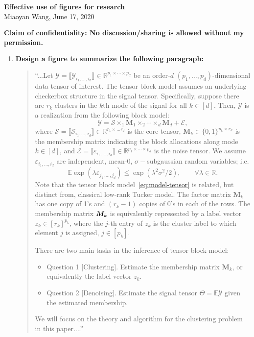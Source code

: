 \documentclass[11pt]{article}
\theoremstyle{plain}
\theoremstyle{definition}
\def\entry#1{\llbracket #1 \rrbracket}
\newcommand{\cS}{\mathcal{S}}
\newcommand{\cE}{{\mathcal{E}}}
\newcommand{\cY}{{\mathcal{Y}}}
\newcommand{\0}{{\mathbf{0}}}
\newcommand{\1}{{\mathbf{1}}}
\newcommand{\M}{{\mathbf{M}}}
\newcommand{\bbR}{\mathbb{R}}
\newcommand{\bbE}{\mathbb{E}}
\begin{document}
\begin{center}
{\bf \large Effective use of figures for research}\\
Miaoyan Wang, June 17, 2020\\
\end{center}

{\bf Claim of confidentiality: No discussion/sharing is allowed without my permission. }
\begin{enumerate}
\item {\bf Design a figure to summarize the following paragraph:}
\begin{quote}
``...Let $\cY=\entry{\cY_{i_1,\dots,i_d}} \in \bbR^{p_1 \times \cdots \times p_d}$ be an order-$d$ $(p_1,\ldots,p_d)$-dimensional data tensor of interest. The tensor block model assumes an underlying checkerbox structure in the signal tensor. Specifically, suppose there are $r_k$ clusters in the $k$th mode of the signal for all $k \in [d]$. Then, $\cY$ is a realization from the following block model:
\begin{equation}\label{eq:model-tensor}
	\cY = \cS \times_1 \M_1 \times_2 \cdots \times_d \M_d + \cE,
\end{equation}
where $\cS=\entry{\cS_{i_1,\ldots,i_d}}\in \bbR^{r_1 \times \ldots r_d}$ is the core tensor, $\M_k\in\{0,1\}^{p_k\times r_k}$ is the membership matrix indicating the block allocations along mode $k\in[d]$, and $\cE=\entry{\varepsilon_{i_1,\ldots,i_d}}\in \mathbb{R}^{p_1\times \cdots \times p_d}$ is the noise tensor. We assume $\varepsilon_{i_1,\ldots,i_d}$ are independent, mean-$0$, $\sigma-$subgaussian random variables; i.e.
\[
\bbE \exp\left(\lambda\varepsilon_{j_1,\ldots,j_d}\right) \leq \exp\left(\lambda^2\sigma^2/2\right),\qquad \forall \lambda \in \bbR.
\]
Note that the tensor block model~\eqref{eq:model-tensor} is related, but distinct from, classical low-rank Tucker model. The factor matrix $\M_k$ has one copy of 1's and $(r_k-1)$ copies of 0's in each of the rows. The membership matrix $\bm M_k$ is equivalently represented by a label vector $z_k\in[r_k]^{p_k}$, where the $j$-th entry of $z_k$ is the cluster label to which element $j$ is assigned, $j\in[p_k].$

There are two main tasks in the inference of tensor block model:
\begin{itemize}
\item Question 1 [Clustering]. Estimate the membership matrix $\M_k$, or equivalently the label vector $z_k.$
\item Question 2 [Denoising]. Estimate the signal tensor $\Theta=\mathbb{E}\cY$ given the estimated membership.
\end{itemize}
We will focus on the theory and algorithm for the clustering problem in this paper....''
\end{quote}


\end{enumerate}
\end{document}

